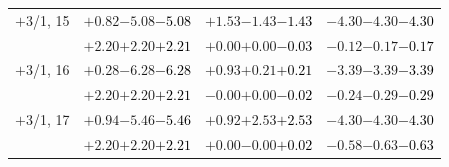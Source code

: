 \documentclass[compress]{beamer}
\begin{document}
\begin{frame}
\begin{tabular}{r | c | c | c}
$+$3/1, 15 & $+0.82$\hspace{0.1 cm}$-5.08$\hspace{0.1 cm}\textcolor{black}{$-5.08$} & $+1.53$\hspace{0.1 cm}$-1.43$\hspace{0.1 cm}\textcolor{black}{$-1.43$} & $-4.30$\hspace{0.1 cm}$-4.30$\hspace{0.1 cm}\textcolor{black}{$-4.30$} \\
           & $+2.20$\hspace{0.1 cm}$+2.20$\hspace{0.1 cm}\textcolor{black}{$+2.21$} & $+0.00$\hspace{0.1 cm}$+0.00$\hspace{0.1 cm}\textcolor{black}{$-0.03$} & $-0.12$\hspace{0.1 cm}$-0.17$\hspace{0.1 cm}\textcolor{black}{$-0.17$} \\
$+$3/1, 16 & $+0.28$\hspace{0.1 cm}$-6.28$\hspace{0.1 cm}\textcolor{black}{$-6.28$} & $+0.93$\hspace{0.1 cm}$+0.21$\hspace{0.1 cm}\textcolor{black}{$+0.21$} & $-3.39$\hspace{0.1 cm}$-3.39$\hspace{0.1 cm}\textcolor{black}{$-3.39$} \\
           & $+2.20$\hspace{0.1 cm}$+2.20$\hspace{0.1 cm}\textcolor{black}{$+2.21$} & $-0.00$\hspace{0.1 cm}$+0.00$\hspace{0.1 cm}\textcolor{black}{$-0.02$} & $-0.24$\hspace{0.1 cm}$-0.29$\hspace{0.1 cm}\textcolor{black}{$-0.29$} \\
$+$3/1, 17 & $+0.94$\hspace{0.1 cm}$-5.46$\hspace{0.1 cm}\textcolor{black}{$-5.46$} & $+0.92$\hspace{0.1 cm}$+2.53$\hspace{0.1 cm}\textcolor{black}{$+2.53$} & $-4.30$\hspace{0.1 cm}$-4.30$\hspace{0.1 cm}\textcolor{black}{$-4.30$} \\
           & $+2.20$\hspace{0.1 cm}$+2.20$\hspace{0.1 cm}\textcolor{black}{$+2.21$} & $+0.00$\hspace{0.1 cm}$-0.00$\hspace{0.1 cm}\textcolor{black}{$+0.02$} & $-0.58$\hspace{0.1 cm}$-0.63$\hspace{0.1 cm}\textcolor{black}{$-0.63$} \\

\end{tabular}
\end{frame}
\end{document}
